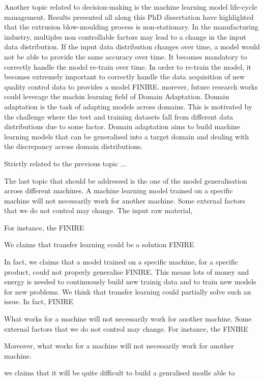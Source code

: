 Another topic related to decision-making is the machine learning model life-cycle management. Results presented all along this PhD dissertation have highlighted that the extrusion blow-moulding process is non-stationary. In the manufacturing industry, multiples non controllable factors may lead to a change in the input data distribution. If the input data distribution changes over time, a model would not be able to provide the same accuracy over time. It becomes mandatory to correctly handle the model re-train over time. In order to re-train the model, it becomes extremely important to correctly handle the data acquisition of new quality control data to provides a model FINIRE. morever, future research works could leverage the machin learning field of Domain Adaptation. Domain adaptation is the task of adapting models across domains. This is motivated by the challenge where the test and training datasets fall from different data distributions due to some factor. Domain adaptation aims to build machine learning models that can be generalised into a target domain and dealing with the discrepancy across domain distributions.
% 



Strictly related to the previous topic ...


The last topic that should be addressed is the one of the model generalisation across different machines. A machine learning model trained on a specific machine will not necessarily work for another machine. Some external factors that we do not control may change. The input raw material, 

For instance, the FINIRE 

We claims that transfer learning could be a solution FINIRE


In fact, we claims that a model trained on a specific machine, for a specific product, could not properly generalise FINIRE. This means lots of money and energy is needed to continuously build new trainig data and to train new models for new problems. We think that transfer learning could partially solve such an issue. In fact, FINIRE

What works for a machine will not necessarily work for another machine. Some external factors that we do not control may change. For instance, the FINIRE 


Moreover, what works for a machine will not necessarily work for another machine. 


% 

we claims that it will be quite difficult to build a genralised modle able to 
% 



\clearpage